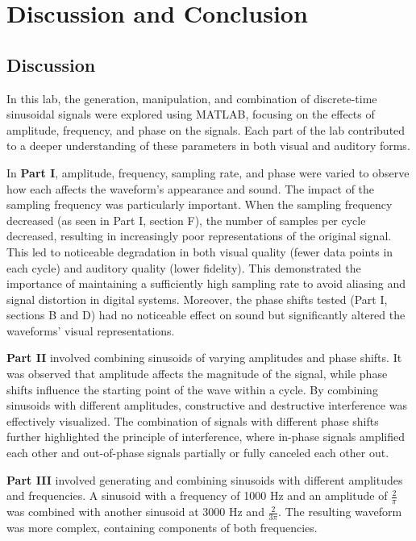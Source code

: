 \documentclass[12pt]{article}
\begin{document}
\section{Discussion and Conclusion}

\subsection{Discussion}

In this lab, the generation, manipulation, and combination of discrete-time 
sinusoidal signals were explored using MATLAB, focusing on the effects of amplitude, 
frequency, and phase on the signals. Each part of the lab contributed to a deeper 
understanding of these parameters in both visual and auditory forms.
\newline

In \textbf{Part I}, amplitude, frequency, sampling rate, and phase were varied to 
observe how each affects the waveform's appearance and sound. 
The impact of the sampling frequency was particularly important. When the sampling 
frequency decreased (as seen in Part I, section F), the number of samples per cycle 
decreased, resulting in increasingly poor representations of the original signal. 
This led to noticeable degradation in both visual quality (fewer data points in each 
cycle) and auditory quality (lower fidelity). This demonstrated the importance of 
maintaining a sufficiently high sampling rate to avoid aliasing and signal distortion 
in digital systems. Moreover, the phase shifts tested (Part I, sections B and D) had 
no noticeable effect on sound but significantly altered the waveforms' visual 
representations.
\newline

\textbf{Part II} involved combining sinusoids of varying amplitudes and phase shifts. 
It was observed that amplitude affects the magnitude of the signal, while phase shifts 
influence the starting point of the wave within a cycle. By combining sinusoids with 
different amplitudes, constructive and destructive interference was effectively 
visualized. The combination of signals with different phase shifts further highlighted 
the principle of interference, where in-phase signals amplified each other and 
out-of-phase signals partially or fully canceled each other out.
\newline

\textbf{Part III} involved generating and combining sinusoids with different 
amplitudes and frequencies. A sinusoid with a frequency of 1000 Hz and an amplitude 
of \( \frac{2}{\pi} \) was combined with another sinusoid at 3000 Hz and 
\( \frac{2}{3\pi} \). The resulting waveform was more complex, containing components 
of both frequencies. 
\newline
\end{document}
